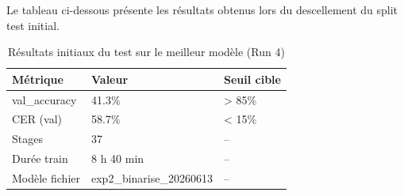 ﻿\documentclass[twoside,twocolumn,10pt]{article}
\begin{document}
\begin{appendices}
Le tableau ci-dessous présente les résultats obtenus lors du descellement du split test initial.

\begin{table}[H]
\fontsize{10}{11}\selectfont
\centering
\caption{Résultats initiaux du test sur le meilleur modèle (Run 4)}
\begin{tabular}{L{2.5cm}C{3cm}C{1.5cm}}
\toprule
Métrique & Valeur & Seuil cible \\
\midrule
val\_accuracy & 41.3\% & > 85\% \\
CER (val) & 58.7\% & < 15\% \\
Stages & 37 & -- \\
Durée train & 8 h 40 min & -- \\
Modèle fichier & exp2\_binarise\_20260613 & -- \\
\bottomrule
\end{tabular}
\end{table}

\end{appendices}
\end{document}
